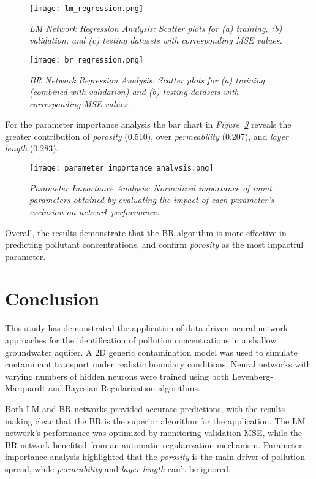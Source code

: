 \documentclass[10pt]{article}
\begin{document}
	\begin{figure}[H]
		\centering
		\texttt{[image: lm\_regression.png]}
		\caption{\textit{LM Network Regression Analysis: Scatter plots for (a) training, (b) validation, and (c) testing datasets with corresponding MSE values.}}
		\label{fig:lm_reg}
	\end{figure}
	\begin{figure}[H]
		\centering
		\texttt{[image: br\_regression.png]}
		\caption{\textit{BR Network Regression Analysis: Scatter plots for (a) training (combined with validation) and (b) testing datasets with corresponding MSE values.}}
		\label{fig:br_reg}
	\end{figure}
	For the parameter importance analysis the bar chart in \textit{Figure~\ref{fig:param_imp}} reveals the greater contribution of \textit{porosity} (0.510), over \textit{permeability} (0.207), and \textit{layer length} (0.283).
	\begin{figure}[H]
		\centering
		\texttt{[image: parameter\_importance\_analysis.png]}
		\caption{\textit{Parameter Importance Analysis: Normalized importance of input parameters obtained by evaluating the impact of each parameter's exclusion on network performance.}}
		\label{fig:param_imp}
	\end{figure}
	Overall, the results demonstrate that the BR algorithm is more effective in predicting pollutant concentrations, and confirm \textit{porosity} as the most impactful parameter.
	
	\section{Conclusion}
	This study has demonstrated the application of data-driven neural network approaches for the identification of pollution concentrations in a shallow groundwater aquifer. A 2D generic contamination model was used to simulate contaminant transport under realistic boundary conditions. Neural networks with varying numbers of hidden neurons were trained using both Levenberg-Marquardt and Bayesian Regularization algorithms. 
	
	Both LM and BR networks provided accurate predictions, with the results making clear that the BR is the superior algorithm for the application. The LM network’s performance was optimized by monitoring validation MSE, while the BR network benefited from an automatic regularization mechanism. Parameter importance analysis highlighted that the \textit{porosity} is the main driver of pollution spread, while \textit{permeability} and \textit{layer length} can't be ignored.
	
\end{document}
